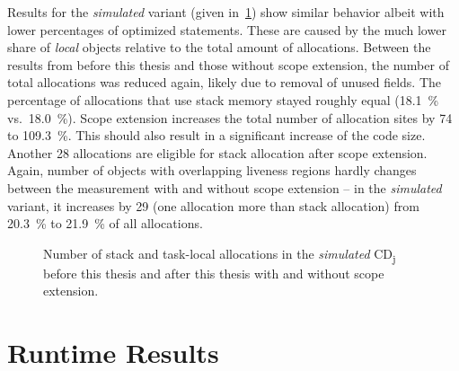 		Results for the \emph{simulated} variant (given in~\cref{fig:eval:static:numallocs:simulated}) show similar behavior
		albeit with lower percentages of optimized statements. These are caused by the much lower share of \emph{local}
		objects relative to the total amount of allocations. Between the results from before this thesis and those without
		scope extension, the number of total allocations was reduced again, likely due to removal of unused fields. The
		percentage of allocations that use stack memory stayed roughly equal (18.1~\% vs.~18.0~\%). Scope extension
		increases the total number of allocation sites by 74 to 109.3~\%. This should also result in a significant increase
		of the code size. Another 28 allocations are eligible for stack allocation after scope extension. Again, number of
		objects with overlapping liveness regions hardly changes between the measurement with and without scope extension
		– in the \emph{simulated} variant, it increases by 29 (one allocation more than stack allocation) from 20.3~\% to
		21.9~\% of all allocations.

		\begin{figure}
			\centering
			

			\caption{%
				Number of stack and task-local allocations in the \emph{simulated} CD\textsubscript{j} before this thesis and
				after this thesis with and without scope extension.}
			\label{fig:eval:static:numallocs:simulated}
		\end{figure}

	\section{Runtime Results}
		\label{sec:eval:runtime}
